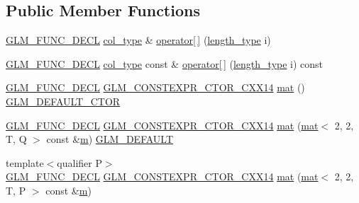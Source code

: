 \subsection*{Public Member Functions}
\begin{DoxyCompactItemize}
\item 
\mbox{\hyperlink{setup_8hpp_ab2d052de21a70539923e9bcbf6e83a51}{G\+L\+M\+\_\+\+F\+U\+N\+C\+\_\+\+D\+E\+CL}} \mbox{\hyperlink{structglm_1_1mat_3_012_00_012_00_01_t_00_01_q_01_4_a2983591534ee443dd378cedcbe771749}{col\+\_\+type}} \& \mbox{\hyperlink{structglm_1_1mat_3_012_00_012_00_01_t_00_01_q_01_4_a3412817642a709f843240b51f05514a5}{operator\mbox{[}$\,$\mbox{]}}} (\mbox{\hyperlink{structglm_1_1mat_3_012_00_012_00_01_t_00_01_q_01_4_a96c65b091fc8fe8e6f5637e30c9c1f81}{length\+\_\+type}} i)
\item 
\mbox{\hyperlink{setup_8hpp_ab2d052de21a70539923e9bcbf6e83a51}{G\+L\+M\+\_\+\+F\+U\+N\+C\+\_\+\+D\+E\+CL}} \mbox{\hyperlink{structglm_1_1mat_3_012_00_012_00_01_t_00_01_q_01_4_a2983591534ee443dd378cedcbe771749}{col\+\_\+type}} const  \& \mbox{\hyperlink{structglm_1_1mat_3_012_00_012_00_01_t_00_01_q_01_4_a06ff5b61af6353d73db79acd46534b0c}{operator\mbox{[}$\,$\mbox{]}}} (\mbox{\hyperlink{structglm_1_1mat_3_012_00_012_00_01_t_00_01_q_01_4_a96c65b091fc8fe8e6f5637e30c9c1f81}{length\+\_\+type}} i) const
\item 
\mbox{\hyperlink{setup_8hpp_ab2d052de21a70539923e9bcbf6e83a51}{G\+L\+M\+\_\+\+F\+U\+N\+C\+\_\+\+D\+E\+CL}} \mbox{\hyperlink{setup_8hpp_a0900f9145e68bf6061b6f5e7be3fa751}{G\+L\+M\+\_\+\+C\+O\+N\+S\+T\+E\+X\+P\+R\+\_\+\+C\+T\+O\+R\+\_\+\+C\+X\+X14}} \mbox{\hyperlink{structglm_1_1mat_3_012_00_012_00_01_t_00_01_q_01_4_a8601499ee4cd49be39e8497bbef84d91}{mat}} () \mbox{\hyperlink{setup_8hpp_afb97a4e995bc004c0cbbfa22125b80ba}{G\+L\+M\+\_\+\+D\+E\+F\+A\+U\+L\+T\+\_\+\+C\+T\+OR}}
\item 
\mbox{\hyperlink{setup_8hpp_ab2d052de21a70539923e9bcbf6e83a51}{G\+L\+M\+\_\+\+F\+U\+N\+C\+\_\+\+D\+E\+CL}} \mbox{\hyperlink{setup_8hpp_a0900f9145e68bf6061b6f5e7be3fa751}{G\+L\+M\+\_\+\+C\+O\+N\+S\+T\+E\+X\+P\+R\+\_\+\+C\+T\+O\+R\+\_\+\+C\+X\+X14}} \mbox{\hyperlink{structglm_1_1mat_3_012_00_012_00_01_t_00_01_q_01_4_aa45ca90831c32104d9c29f84ec0b9dac}{mat}} (\mbox{\hyperlink{structglm_1_1mat}{mat}}$<$ 2, 2, T, Q $>$ const \&\mbox{\hyperlink{_s_d_l__opengl__glext_8h_af593500c283bf1a787a6f947f503a5c2}{m}}) \mbox{\hyperlink{setup_8hpp_aefce7051c376a64ba89fa93a9f63bc2c}{G\+L\+M\+\_\+\+D\+E\+F\+A\+U\+LT}}
\item 
{\footnotesize template$<$qualifier P$>$ }\\\mbox{\hyperlink{setup_8hpp_ab2d052de21a70539923e9bcbf6e83a51}{G\+L\+M\+\_\+\+F\+U\+N\+C\+\_\+\+D\+E\+CL}} \mbox{\hyperlink{setup_8hpp_a0900f9145e68bf6061b6f5e7be3fa751}{G\+L\+M\+\_\+\+C\+O\+N\+S\+T\+E\+X\+P\+R\+\_\+\+C\+T\+O\+R\+\_\+\+C\+X\+X14}} \mbox{\hyperlink{structglm_1_1mat_3_012_00_012_00_01_t_00_01_q_01_4_a0e9852f49f319a99409e663be26c089e}{mat}} (\mbox{\hyperlink{structglm_1_1mat}{mat}}$<$ 2, 2, T, P $>$ const \&\mbox{\hyperlink{_s_d_l__opengl__glext_8h_af593500c283bf1a787a6f947f503a5c2}{m}})

\end{DoxyCompactItemize}
